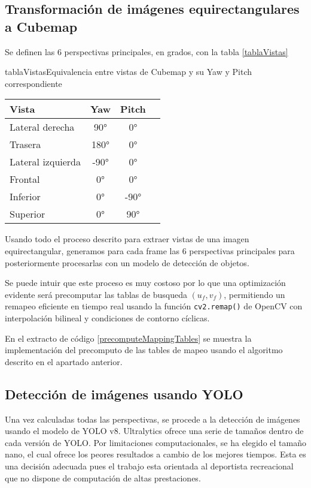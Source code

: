 \subsection{Transformación de imágenes equirectangulares a Cubemap}

Se definen las 6 perspectivas principales, en grados, con la tabla \ref{tablaVistas}

\begin{table}{tablaVistas}{Equivalencia entre vistas de Cubemap y su Yaw y Pitch correspondiente}
	\begin{tabular}{lccc}
		\toprule
		\textbf{Vista} & \textbf{Yaw} & \textbf{Pitch} & \\
		\midrule
		Lateral derecha & 90° & 0° & \\
		Trasera & 180° & 0° & \\
		Lateral izquierda & -90° & 0° & \\
		Frontal & 0° & 0° & \\
		Inferior & 0° & -90° & \\
		Superior & 0° & 90° & \\
		\bottomrule
	\end{tabular}
\end{table}

Usando todo el proceso descrito para extraer vistas de una imagen equirectangular, generamos para cada frame las 6 perspectivas principales para posteriormente procesarlas con un modelo de detección de objetos.

Se puede intuir que este proceso es muy costoso por lo que una optimización evidente será precomputar las tablas de busqueda $(u_f, v_f)$, permitiendo un remapeo eficiente en tiempo real usando la función \verb|cv2.remap()| de OpenCV con interpolación bilineal y condiciones de contorno cíclicas.

En el extracto de código \ref{precomputeMappingTables} se muestra la implementación del precomputo de las tables de mapeo usando el algoritmo descrito en el apartado anterior.


\subsection{Detección de imágenes usando YOLO}
Una vez calculadas todas las perspectivas, se procede a la detección de imágenes usando el modelo de YOLO v8. Ultralytics ofrece una serie de tamaños dentro de cada versión de YOLO. Por limitaciones computacionales, se ha elegido el tamaño nano, el cual ofrece los peores resultados a cambio de los mejores tiempos. Esta es una decisión adecuada pues el trabajo esta orientada al deportista recreacional que no dispone de computación de altas prestaciones.

